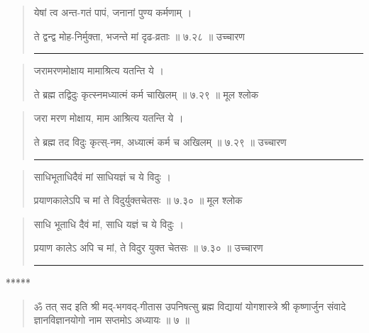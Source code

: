 \begin{quotation}
येषां त्व अन्त-गतं पापं, जनानां पुण्य कर्मणाम्‌  ।  

ते द्वन्द्व मोह-निर्मुक्ता, भजन्ते मां दृढ-व्रताः  ॥ ७.२८ ॥  उच्चारण

\noindent\rule{16cm}{0.4pt} 
\end{quotation}


\begin{quotation} 
जरामरणमोक्षाय मामाश्रित्य यतन्ति ये  ।  

ते ब्रह्म तद्विदुः कृत्स्नमध्यात्मं कर्म चाखिलम्‌  ॥ ७.२९ ॥  मूल श्लोक
\end{quotation}

\begin{quotation}
जरा मरण मोक्षाय, माम आश्रित्य यतन्ति ये  ।  

ते ब्रह्म तद विदुः कृत्स्-नम, अध्यात्मं कर्म च अखिलम्‌  ॥ ७.२९ ॥  उच्चारण

\noindent\rule{16cm}{0.4pt} 
\end{quotation}


\begin{quotation} 
साधिभूताधिदैवं मां साधियज्ञं च ये विदुः  ।  

प्रयाणकालेऽपि च मां ते विदुर्युक्तचेतसः  ॥ ७.३० ॥  मूल श्लोक
\end{quotation}

\begin{quotation}
साधि भूताधि दैवं मां, साधि यज्ञं च ये विदुः  ।  

प्रयाण कालेऽ अपि च मां, ते विदुर युक्त चेतसः  ॥ ७.३० ॥  उच्चारण

\noindent\rule{16cm}{0.4pt} 
\end{quotation}

\begin{center} ***** \end{center}

\begin{quotation}  

ॐ तत् सद इति श्री मद्-भगवद्-गीतास उपनिषत्सु ब्रह्म विद्यायां योगशास्त्रे श्री कृष्णार्जुन संवादे ज्ञानविज्ञानयोगो नाम सप्तमोऽ अध्यायः  ॥  ७ ॥ 

\end{quotation}
